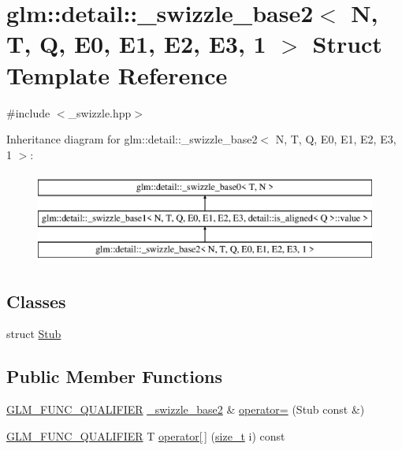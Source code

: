 \hypertarget{structglm_1_1detail_1_1__swizzle__base2_3_01_n_00_01_t_00_01_q_00_01_e0_00_01_e1_00_01_e2_00_01_e3_00_011_01_4}{}\section{glm\+:\+:detail\+:\+:\+\_\+swizzle\+\_\+base2$<$ N, T, Q, E0, E1, E2, E3, 1 $>$ Struct Template Reference}
\label{structglm_1_1detail_1_1__swizzle__base2_3_01_n_00_01_t_00_01_q_00_01_e0_00_01_e1_00_01_e2_00_01_e3_00_011_01_4}


{\ttfamily \#include $<$\+\_\+swizzle.\+hpp$>$}

Inheritance diagram for glm\+:\+:detail\+:\+:\+\_\+swizzle\+\_\+base2$<$ N, T, Q, E0, E1, E2, E3, 1 $>$\+:\begin{figure}[H]
\begin{center}
\leavevmode
\includegraphics[height=3.000000cm]{structglm_1_1detail_1_1__swizzle__base2_3_01_n_00_01_t_00_01_q_00_01_e0_00_01_e1_00_01_e2_00_01_e3_00_011_01_4}
\end{center}
\end{figure}
\subsection*{Classes}
\begin{DoxyCompactItemize}
\item 
struct \hyperlink{structglm_1_1detail_1_1__swizzle__base2_3_01_n_00_01_t_00_01_q_00_01_e0_00_01_e1_00_01_e2_00_01_e3_00_011_01_4_1_1_stub}{Stub}
\end{DoxyCompactItemize}
\subsection*{Public Member Functions}
\begin{DoxyCompactItemize}
\item 
\hyperlink{setup_8hpp_a33fdea6f91c5f834105f7415e2a64407}{G\+L\+M\+\_\+\+F\+U\+N\+C\+\_\+\+Q\+U\+A\+L\+I\+F\+I\+ER} \hyperlink{structglm_1_1detail_1_1__swizzle__base2}{\+\_\+swizzle\+\_\+base2} \& \hyperlink{structglm_1_1detail_1_1__swizzle__base2_3_01_n_00_01_t_00_01_q_00_01_e0_00_01_e1_00_01_e2_00_01_e3_00_011_01_4_ac03f20f08c7f9d891981cd889dc226f8}{operator=} (Stub const \&)
\item 
\hyperlink{setup_8hpp_a33fdea6f91c5f834105f7415e2a64407}{G\+L\+M\+\_\+\+F\+U\+N\+C\+\_\+\+Q\+U\+A\+L\+I\+F\+I\+ER} T \hyperlink{structglm_1_1detail_1_1__swizzle__base2_3_01_n_00_01_t_00_01_q_00_01_e0_00_01_e1_00_01_e2_00_01_e3_00_011_01_4_a991d5b0234288e6751481164111e2a92}{operator\mbox{[}$\,$\mbox{]}} (\hyperlink{_s_d_l__config__winrt_8h_a7c94ea6f8948649f8d181ae55911eeaf}{size\+\_\+t} i) const
\end{DoxyCompactItemize}
